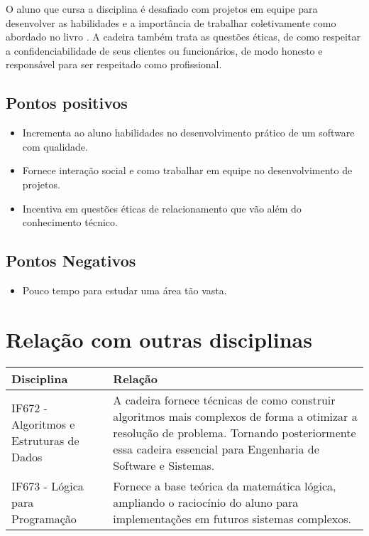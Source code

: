 \documentclass[a4paper]{article}
\begin{document}
\pagebreak

O aluno que cursa a disciplina é desafiado com projetos em equipe para desenvolver as habilidades e a importância de trabalhar coletivamente como abordado no livro \cite{mt2010desenvolvimento}. A cadeira também trata as questões éticas, de como respeitar a confidenciabilidade de seus clientes ou funcionários, de modo honesto e responsável para ser respeitado como profissional\cite{slidedaaula}.

\subsection{Pontos positivos}
\begin{itemize}

\item Incrementa ao aluno habilidades no desenvolvimento prático de um software com qualidade.
\item Fornece interação social e como trabalhar em equipe no desenvolvimento de projetos.
\item Incentiva em questões éticas de relacionamento que vão além do conhecimento técnico.

\end{itemize}


\subsection{Pontos Negativos}
\begin{itemize}

\item Pouco tempo para estudar uma área tão vasta.

\end{itemize}

\section{Relação com outras disciplinas}

\begin{table} [h]
\centering
\begin{tabular}{|l|p{9.0cm}|} \hline

Disciplina & Relação \\\hline

IF672 - Algoritmos e Estruturas de Dados & A cadeira fornece técnicas de como construir algoritmos mais complexos de forma a otimizar a resolução de problema. Tornando posteriormente essa cadeira essencial para Engenharia de Software e Sistemas. \\\hline

IF673 - Lógica para Programação & Fornece a base teórica da matemática lógica, ampliando o raciocínio do aluno para implementações em futuros sistemas complexos. \\\hline

\end{tabular}
\end{table}



\end{document}
